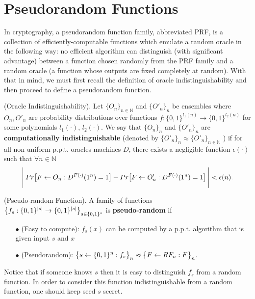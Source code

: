 \section{Pseudorandom Functions} \label{sec:PRF}
In cryptography, a pseudorandom function family, abbreviated PRF, is a collection of efficiently-computable functions which emulate a random oracle in the following way: no efficient algorithm can distinguish (with significant advantage) between a function chosen randomly from the PRF family and a random oracle (a function whose outputs are fixed completely at random). With that in mind,
we must first recall the definition of oracle indistinguishability and then proceed to define a pseudorandom function.

\begin{definition}{(Oracle Indistinguishability).} \textnormal{\cite{ACI}}
  Let $\{ O_n \}_{n \in \mathbb{N}}$ and $\{ O'_{n} \}_{n}$ be ensembles where $O_n, O'_n$ are probability
  distributions over functions $f: \{ 0,1 \}^{l_1(n)} \rightarrow \{ 0,1 \}^{l_2(n)}$ for some polynomials $l_1(\cdot)$, $l_2(\cdot)$. We say that $\{ O_{n} \}_{n}$ and $\{ O'_{n} \}_{n}$ are \textbf{computationally indistinguishable} (denoted by $\{ O'_{n} \}_{n} \approx \{ O'_n \}_{n \in \mathbb{N}}$
  ) if for all non-uniform p.p.t. oracles machines $D$, there exists a negligible function $\epsilon(\cdot)$ such that $\forall n \in \mathbb{N}$
  \begin{equation}{\label{oracle}}
    \Bigg{\lvert} \: Pr \big{[} F \leftarrow O_n : D^{F(\cdot)}(1^n)=1 \big{]} - Pr \big{[} F \leftarrow O'_n : D^{F(\cdot)}(1^n)=1 \big{]} \: \Bigg{\rvert} < \epsilon(n).
  \end{equation}
\end{definition}

\begin{definition}{(Pseudo-random Function).} \textnormal{\cite{ACI}}
  A family of functions $\big{\{} f_s: \{ 0,1 \}^{\lvert s \rvert} \rightarrow \{ 0,1 \}^{\lvert s \rvert} \big{\}}_{s \in \{ 0,1 \}^{*}}$ is \textbf{pseudo-random} if
  \begin{itemize}
    \item[$\bullet$] (Easy to compute): $f_s(x)$ can be computed by a p.p.t. algorithm that is given input $s$ and $x$
    \item[$\bullet$] (Pseudorandom): $\big{\{} s \leftarrow \{ 0,1 \}^n: f_s \big{\}}_n \approx \big{\{} F \leftarrow RF_n: F \big{\}}_n$.
  \end{itemize}
\end{definition}
Notice that if someone knows $s$ then it is easy to distinguish $f_s$ from a random function. In order to consider this function indistinguishable from a random function, one should keep seed $s$ secret.
%

